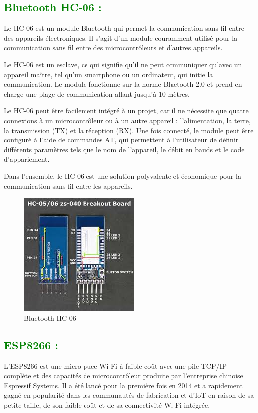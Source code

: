 \begin{flushleft}
	\subsection{\textcolor{green}{Bluetooth HC-06 :}}
	Le HC-06 est un module Bluetooth qui permet la communication sans fil entre des appareils électroniques. Il s'agit d'un module couramment utilisé pour la communication sans fil entre des microcontrôleurs et d'autres appareils.
	
	Le HC-06 est un esclave, ce qui signifie qu'il ne peut communiquer qu'avec un appareil maître, tel qu'un smartphone ou un ordinateur, qui initie la communication. Le module fonctionne sur la norme Bluetooth 2.0 et prend en charge une plage de communication allant jusqu'à 10 mètres.
	
	Le HC-06 peut être facilement intégré à un projet, car il ne nécessite que quatre connexions à un microcontrôleur ou à un autre appareil : l'alimentation, la terre, la transmission (TX) et la réception (RX). Une fois connecté, le module peut être configuré à l'aide de commandes AT, qui permettent à l'utilisateur de définir différents paramètres tels que le nom de l'appareil, le débit en bauds et le code d'appariement.
	
	Dans l'ensemble, le HC-06 est une solution polyvalente et économique pour la communication sans fil entre les appareils.
	\begin{figure}[h]
		\centering
		\includegraphics{chapitres/images/bleutouth.jpg}
		\caption{Bluetooth HC-06}
		\label{fig:labelname}
	\end{figure}
	\subsection{\textcolor{green}{ESP8266 :}}
	L'ESP8266 est une micro-puce Wi-Fi à faible coût avec une pile TCP/IP complète et des capacités de microcontrôleur produite par l'entreprise chinoise Espressif Systems. Il a été lancé pour la première fois en 2014 et a rapidement gagné en popularité dans les communautés de fabrication et d'IoT en raison de sa petite taille, de son faible coût et de sa connectivité Wi-Fi intégrée.
	

\end{flushleft}
